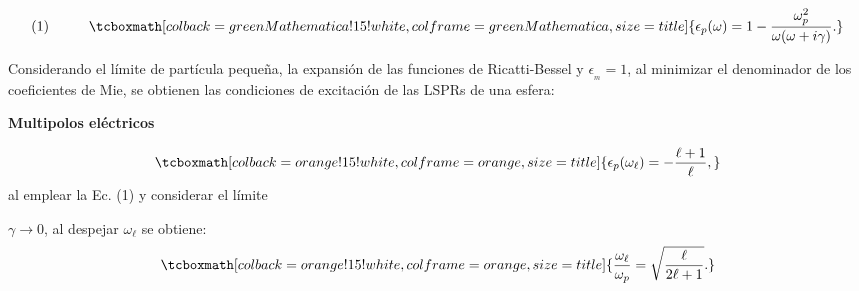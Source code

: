 \documentclass[a0paper,portrait]{baposter}
\begin{document}
\begin{poster}
{			\begin{minipage}[c]{0.57\textwidth}
				$$\text{(1)}\hspace{1cm} \tcboxmath[colback=greenMathematica!15!white ,colframe=greenMathematica,size=title]{\epsilon_p(\omega) =1-\frac{\omega_p^2}{\omega(\omega+i\gamma)}.}$$
			\end{minipage}
				\begin{minipage}[c]{0.42\textwidth}
			\end{minipage}			
			
			
			\vspace{0.2cm}
			Considerando el límite de partícula pequeña, la expansión de las funciones de Ricatti-Bessel \cite{Abramowitz} y $\epsilon__m=1$, al minimizar el denominador de los coeficientes de Mie, se obtienen las condiciones de excitación de las LSPRs de una esfera:\\
			
		
			\begin{minipage}[c]{.55\linewidth}
				\centerline{ {\color{orange}\textbf{Multipolos eléctricos} } }
				
				\vspace{-0.1cm}
				$$\tcboxmath[colback=orange!15!white ,colframe=orange,size=title]{\epsilon_p(\omega_\ell)=-\frac{\ell+1}{\ell},}$$
				al emplear la Ec. (1) y considerar el límite 
				
				$\gamma\rightarrow0$, al despejar $\omega_{\ell}$ se obtiene: 
				$$\tcboxmath[colback=orange!15!white ,colframe=orange,size=title]{\frac{\omega_\ell}{\omega_p}=\sqrt{\frac{\ell}{2\ell+1}}.}$$
				
			\end{minipage}
			}
\end{poster}
\end{document}
